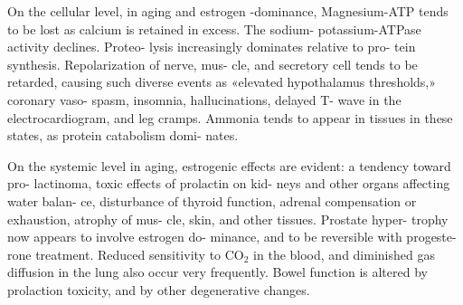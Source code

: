\documentclass[10pt]{memoir}
\begin{document}
\begin{multicols}{2}
	\bigskip

	\noindent On the cellular level, in aging and estrogen\linebreak
	-dominance, Magnesium-ATP tends to be lost\linebreak
	as calcium is retained in excess. The sodium-\linebreak
	potassium-ATPase activity declines. Proteo-\linebreak
	lysis increasingly dominates relative to pro-\linebreak
	tein synthesis. Repolarization of nerve, mus-\linebreak
	cle, and secretory cell tends to be retarded,\linebreak
	causing such diverse events as «elevated\linebreak
	hypothalamus thresholds,» coronary vaso-\linebreak
	spasm, insomnia, hallucinations, delayed T-\linebreak
	wave in the electrocardiogram, and leg\linebreak
	cramps. Ammonia tends to appear in tissues\linebreak
	in these states, as protein catabolism domi-\linebreak
	nates.

	\bigskip

	\noindent On the systemic level in aging, estrogenic\linebreak
	effects are evident: a tendency toward pro-\linebreak
	lactinoma, toxic effects of prolactin on kid-\linebreak
	neys and other organs affecting water balan-\linebreak
	ce, disturbance of thyroid function, adrenal\linebreak
	compensation or exhaustion, atrophy of mus-\linebreak
	cle, skin, and other tissues. Prostate hyper-\linebreak
	trophy now appears to involve estrogen do-\linebreak
	minance, and to be reversible with progeste-\linebreak
	rone treatment. Reduced sensitivity to CO$_{2}$\linebreak
	in the blood, and diminished gas diffusion in\linebreak
	the lung also occur very frequently. Bowel\linebreak
	function is altered by prolaction toxicity, and\linebreak
	by other degenerative changes.


\end{multicols}
\end{document}
